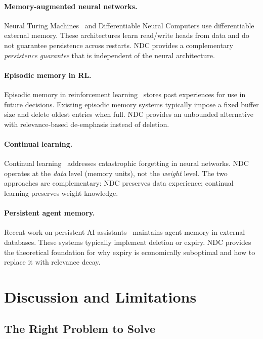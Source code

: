 \documentclass[12pt]{article}
\begin{document}
\paragraph{Memory-augmented neural networks.}
Neural Turing Machines~\cite{graves2014} and Differentiable Neural Computers
\cite{graves2016} use differentiable external memory.  These architectures
learn read/write heads from data and do not guarantee persistence across
restarts.  NDC provides a complementary \emph{persistence guarantee} that is
independent of the neural architecture.

\paragraph{Episodic memory in RL.}
Episodic memory in reinforcement learning~\cite{lengyel2008, blundell2016}
stores past experiences for use in future decisions.  Existing episodic memory
systems typically impose a fixed buffer size and delete oldest entries when full.
NDC provides an unbounded alternative with relevance-based de-emphasis instead
of deletion.

\paragraph{Continual learning.}
Continual learning~\cite{kirkpatrick2017, rebuffi2017} addresses catastrophic
forgetting in neural networks.  NDC operates at the \emph{data} level (memory
units), not the \emph{weight} level.  The two approaches are complementary: NDC
preserves data experience; continual learning preserves weight knowledge.

\paragraph{Persistent agent memory.}
Recent work on persistent AI assistants~\cite{park2023, shinn2023} maintains
agent memory in external databases.  These systems typically implement deletion
or expiry.  NDC provides the theoretical foundation for why expiry is
economically suboptimal and how to replace it with relevance decay.

\section{Discussion and Limitations}
\label{sec:discussion}

\subsection{The Right Problem to Solve}
\end{document}
